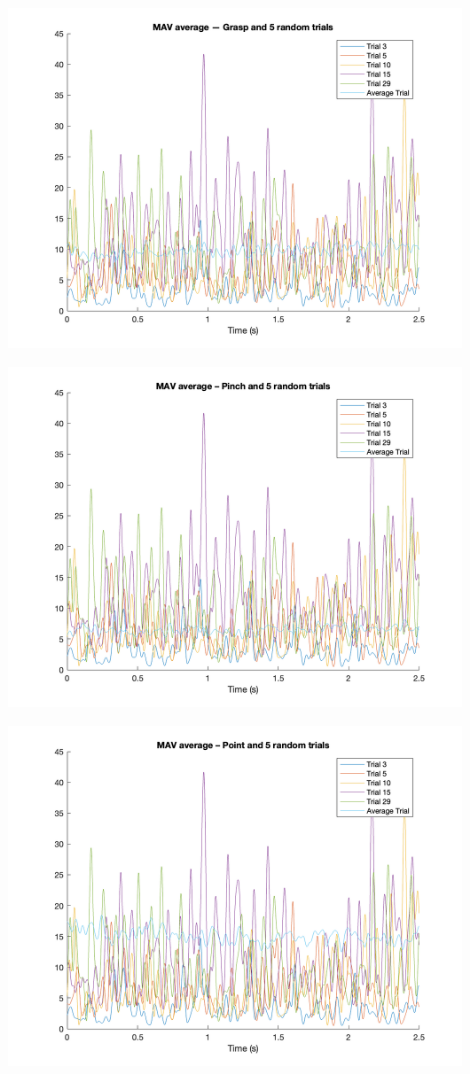 \documentclass[12pt]{article}
\begin{document}
\begin{center}
    \includegraphics[width=0.9\textwidth]{grasp.png}
\end{center}

\begin{center}
    \includegraphics[width=0.9\textwidth]{pinch.png}
\end{center}

\begin{center}
    \includegraphics[width=0.9\textwidth]{point.png}
\end{center}
\end{document}
